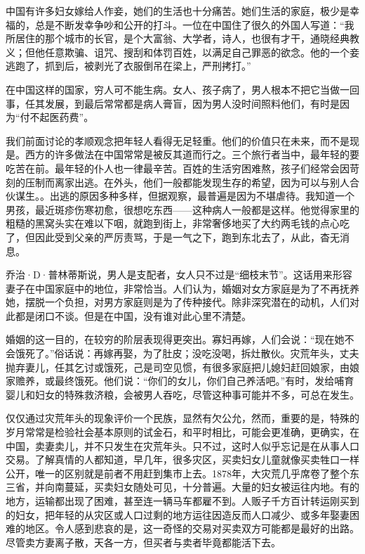 \documentclass[12pt,oneside]{book}
\begin{document}
\begin{common-format}
中国有许多妇女嫁给人作妾，她们的生活也十分痛苦。她们生活的家庭，极少是幸福的，总是不断发幸争吵和公开的打斗。一位在中国住了很久的外国人写道：“我所居住的那个城市的长官，是个大富翁、大学者，诗人，也很有才干，通晓经典教义；但他任意欺骗、诅咒、搜刮和体罚百姓，以满足自己罪恶的欲念。他的一个妾逃跑了，抓到后，被剥光了衣服倒吊在梁上，严刑拷打。” 

在中国这样的国家，穷人可不能生病。女人、孩子病了，男人根本不把它当做一回事，任其发展，到最后常常都是病人膏盲，因为男人没时间照料他们，有时是因为“付不起医药费”。 

我们前面讨论的孝顺观念把年轻人看得无足轻重。他们的价值只在未来，而不是现是。西方的许多做法在中国常常是被反其道而行之。三个旅行者当中，最年轻的要吃苦在前。最年轻的仆人也一律最辛苦。百姓的生活穷困难熬，孩子们经常会因苛刻的压制而离家出逃。在外头，他们一般都能发现生存的希望，因为可以与别人合伙谋生。。出逃的原因多种多样，但据观察，最普遍是因为不堪虐待。我知道一个男孩，最近斑疹伤寒初愈，很想吃东西——这种病人一般都是这样。他觉得家里的粗糙的黑窝头实在难以下咽，就跑到街上，非常奢侈地买了大约两毛钱的点心吃了，但因此受到父亲的严厉责骂，于是一气之下，跑到东北去了，从此，杳无消息。 

乔治·D·普林蒂斯说，男人是支配者，女人只不过是“细枝末节”。这话用来形容妻子在中国家庭中的地位，非常恰当。人们认为，婚姻对女方家庭是为了不再抚养她，摆脱一个负担，对男方家庭则是为了传种接代。除非深究潜在的动机，人们对此都是闭口不谈。但是在中国，没有谁对此心里不清楚。 

婚姻的这一目的，在较穷的阶层表现得更突出。寡妇再嫁，人们会说：“现在她不会饿死了。”俗话说：再嫁再娶，为了肚皮；没吃没喝，拆灶散伙。灾荒年头，丈夫抛弃妻儿，任其乞讨或饿死，己是司空见惯，有很多家庭把儿媳妇赶回娘家，由娘家赡养，或最终饿死。他们说：“你们的女儿，你们自己养活吧。”有时，发给哺育婴儿和妇女的特殊救济粮，会被男人吞吃，尽管这种事可能并不多，可总在发生。 

仅仅通过灾荒年头的现象评价一个民族，显然有欠公允，然而，重要的是，特殊的岁月常常是检验社会基本原则的试金石，和平时相比，可能会更准确，更确实，在中国，卖妻卖儿，并不只发生在灾荒年头。只不过，这时人似乎忘记是在从事人口交易。了解真情的人都知道，早几年，很多灾区，买卖妇女儿童就像买卖牲口一样公开，唯一的区别就是前者不用赶到集市上去。1878年，大灾荒几乎席卷了整个东三省，并向南蔓延，买卖妇女随处可见，十分普遍。大量的妇女被运往内地。有的地方，运输都出现了困难，甚至连一辆马车都雇不到。人贩子千方百计转运刚买到的妇女，把年轻的从灾区或人口过剩的地方运往因造反而人口减少、或多年娶妻困难的地区。令人感到悲哀的是，这一奇怪的交易对买卖双方可能都是最好的出路。尽管卖方妻离子散，天各一方，但买者与卖者毕竟都能活下去。 


\end{common-format}
\end{document}
